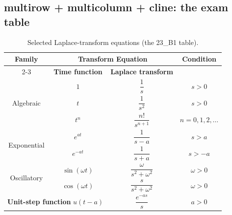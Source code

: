 \documentclass[11pt,a4paper]{article}
\theoremstyle{definition}                   %
\begin{document}
\subsection{multirow + multicolumn + cline: the exam table}
%
%
%
%
%
\begin{table}[H]
    \centering
    \caption{Selected Laplace-transform equations (the 23\_B1 table).}
    \label{tab:laplace}
    \renewcommand{\arraystretch}{1.8}
    \begin{tabular}{|c|c|c|c|}
    \hline
    \multirow{2}{*}{\textbf{Family}} &
      \multicolumn{2}{c|}{\textbf{Transform Equation}} &
      \multirow{2}{*}{\textbf{Condition}} \\
    \cline{2-3}
      & \textbf{Time function} & \textbf{Laplace transform} & \\
    \hline
    \multirow{3}{*}{Algebraic} & $1$   & $\dfrac{1}{s}$        & $s > 0$ \\
    \cline{2-4}
      & $t$   & $\dfrac{1}{s^2}$      & $s > 0$ \\
    \cline{2-4}
      & $t^n$ & $\dfrac{n!}{s^{n+1}}$ & $n = 0, 1, 2, \dots$ \\
    \hline
    \multirow{2}{*}{Exponential} & $e^{at}$  & $\dfrac{1}{s-a}$ & $s > a$ \\
    \cline{2-4}
      & $e^{-at}$ & $\dfrac{1}{s+a}$ & $s > -a$ \\
    \hline
    \multirow{2}{*}{Oscillatory} & $\sin(\omega t)$ & $\dfrac{\omega}{s^2+\omega^2}$ & $\omega > 0$ \\
    \cline{2-4}
      & $\cos(\omega t)$ & $\dfrac{s}{s^2+\omega^2}$ & $\omega > 0$ \\
    \hline
    \multicolumn{2}{|c|}{\textbf{Unit-step function } $u(t-a)$} & $\dfrac{e^{-as}}{s}$ & $a > 0$ \\
    \hline
    \end{tabular}
\end{table}
\end{document}
